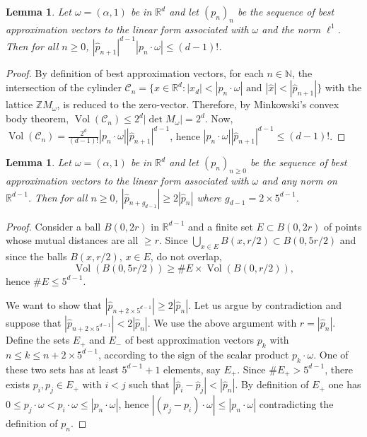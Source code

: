 \documentclass[12pt,reqno,a4paper]{amsart}%
\numberwithin{equation}{section}
\newtheorem{lemma}[theorem]{Lemma}
\newcommand{\CC}{{\mathcal C}}
\newcommand{\Rr}{{\mathbb{R}}}
\newcommand{\Zz}{{\mathbb{Z}}}
\begin{document}
	\begin{lemma}\label{lem:Dirichlet} Let $\omega=(\alpha,1)$ be in $\Rr^d$ and let $(p_n)_n$ be the sequence of best approximation vectors to the linear form associated with $\omega$ and the norm $\ell^1$. Then for all $n\geq 0$,
		$|\hat p_{n+1}|^{d-1}|p_n\cdot\omega|\leq (d-1)!$.
	\end{lemma}
	\begin{proof}
		By definition of best approximation vectors, for each $n\in\mathbb N$, the intersection of the cylinder $\CC_n=\{x\in\Rr^d:|x_d|<|p_{n}\cdot\omega|\text{ and } |\hat x|<|\hat p_{n+1}|\}$ with the lattice $\Zz M_{\omega}$, is reduced to the zero-vector. Therefore, by Minkowski's convex body theorem, 
		$\operatorname{Vol}(\CC_n)\leq 2^d|\operatorname{det}M_{\omega}|=2^d$. Now, $\operatorname{Vol}(\CC_n)=\frac{2^d}{(d-1)!}|p_{n}\cdot\omega||\hat p_{n+1}|^{d-1}$, hence $|p_{n}\cdot\omega||\hat p_{n+1}|^{d-1}\leq (d-1)!$.  	
			\end{proof}
	\begin{lemma}\label{lem:egr}
		Let $\omega=(\alpha,1)$ be in $\Rr^d$ and let $(p_n)_{n\geq 0}$ be the sequence of best approximation vectors to the linear form associated with $\omega$ and any norm on $\Rr^{d-1}$. Then for all $n\geq 0$, $|\hat p_{n+g_{d-1}}|\geq 2|\hat p_n|$ where $g_{d-1}=2\times 5^{d-1}$.
	\end{lemma}
	\begin{proof}
		Consider a ball $B(0,2r)$ in $\Rr^{d-1}$ and a finite set $E\subset B(0,2r)$ of points whose mutual distances are all $\geq r$. Since $\bigcup_{x\in E}B(x,r/2)\subset B(0,5r/2)$ and since the balls $B(x,r/2)$, $x\in E$, do not overlap,  
		$$
		\operatorname{Vol}(B(0,5r/2))\geq \#E\times \operatorname{Vol}(B(0,r/2)),$$ 
hence $\#E\leq 5^{d-1}$. 
		
		We want to show that  $|\hat p_{n+2\times 5^{d-1}}|\geq 2|\hat p_n|$. Let us argue by contradiction and suppose that $|\hat p_{n+2\times 5^{d-1}}|< 2|\hat p_n|$. We use the above argument with $r=|\hat p_{n}|$.  Define the sets $E_+$ and $E_-$ of best approximation vectors $p_k$ with $ n\leq k\leq n+2\times 5^{d-1}$, according to the sign of the scalar product $p_k\cdot\omega$. One of these two sets has at least $5^{d-1}+1$ elements, say $E_+$.  Since $\#E_+> 5^{d-1}$, there exists $p_i, p_j\in E_+$ with $i<j$ such that $|\hat p_i-\hat p_j|< |\hat p_n|$.   	By definition of $E_+$ one has $0\leq p_j\cdot\omega<p_i\cdot\omega\leq|p_n\cdot\omega|$, hence $|(p_j- p_i)\cdot\omega|\leq |p_n\cdot\omega|$ contradicting the definition of $p_n$.
	\end{proof}
	
\end{document}
